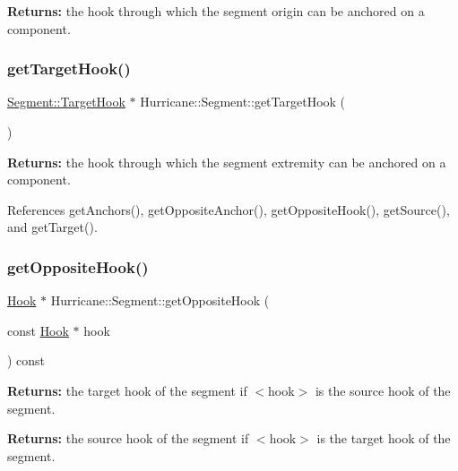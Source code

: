 {\bfseries Returns\+:} the hook through which the segment origin can be anchored on a component. \mbox{\label{classHurricane_1_1Segment_a0fe6cd20516eca2a0b5639ab886bd831}} 
\subsubsection{\texorpdfstring{get\+Target\+Hook()}{getTargetHook()}}
{\footnotesize\ttfamily \hyperlink{classHurricane_1_1Segment_1_1TargetHook}{Segment\+::\+Target\+Hook} $\ast$ Hurricane\+::\+Segment\+::get\+Target\+Hook (\begin{DoxyParamCaption}{ }\end{DoxyParamCaption})\hspace{0.3cm}{\ttfamily [inline]}}

{\bfseries Returns\+:} the hook through which the segment extremity can be anchored on a component. 

References get\+Anchors(), get\+Opposite\+Anchor(), get\+Opposite\+Hook(), get\+Source(), and get\+Target().

\mbox{\label{classHurricane_1_1Segment_afcd8471a2f2cfaa0e8e78a84ff7c09fc}} 
\subsubsection{\texorpdfstring{get\+Opposite\+Hook()}{getOppositeHook()}}
{\footnotesize\ttfamily \hyperlink{classHurricane_1_1Hook}{Hook} $\ast$ Hurricane\+::\+Segment\+::get\+Opposite\+Hook (\begin{DoxyParamCaption}\item[{const \hyperlink{classHurricane_1_1Hook}{Hook} $\ast$}]{hook }\end{DoxyParamCaption}) const}

{\bfseries Returns\+:} the target hook of the segment if {\ttfamily $<$hook$>$} is the source hook of the segment.

{\bfseries Returns\+:} the source hook of the segment if {\ttfamily $<$hook$>$} is the target hook of the segment.

